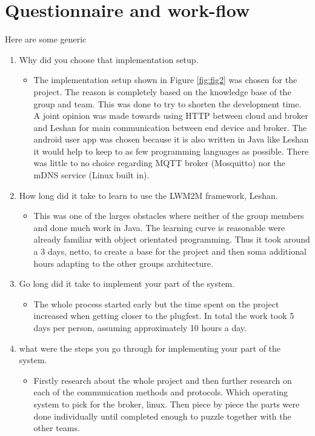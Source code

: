 \documentclass[11pt]{article}
\begin{document}
\section{Questionnaire and work-flow}

Here are some generic 
\begin{enumerate}
	
	\item Why did you choose that implementation setup.
	\begin{itemize}
		\item The implementation setup shown in Figure \ref{fig:fig2} was chosen for the project. The reason is completely based on the knowledge base of the group and team. This was done to try to shorten the development time. A joint opinion was made towards using HTTP between cloud and broker and Leshan for main communication between end device and broker. The android user app was chosen because it is also written in Java like Leshan it would help to keep to as few programming languages as possible. There was little to no choice regarding MQTT broker (Mosquitto) nor the mDNS service (Linux built in).
	\end{itemize}
	\item How long did it take to learn to use the LWM2M framework, Leshan.
	\begin{itemize}
		\item This was one of the larges obstacles where neither of the group members and done much work in Java. The learning curve is reasonable were already familiar with object orientated programming. Thus it took around a 3 days, netto, to create a base for the project and then soma additional hours adapting to the other groups architecture. 
	\end{itemize}
	\item Go long did it take to implement your part of the system.
	\begin{itemize}
		\item The whole process started early but the time spent on the project increased when getting closer to the plugfest. In total the work took 5 days per person, assuming approximately 10 hours a day.
	\end{itemize}
	\item what were the steps you go through for implementing your part of the system.
	\begin{itemize}
		\item Firstly research about the whole project and then further research on each of the communication methods and protocols. Which operating system to pick for the broker, linux. Then piece by piece the parts were done individually until completed enough to puzzle together with the other teams.

\end{itemize}
\end{enumerate}
\end{document}
